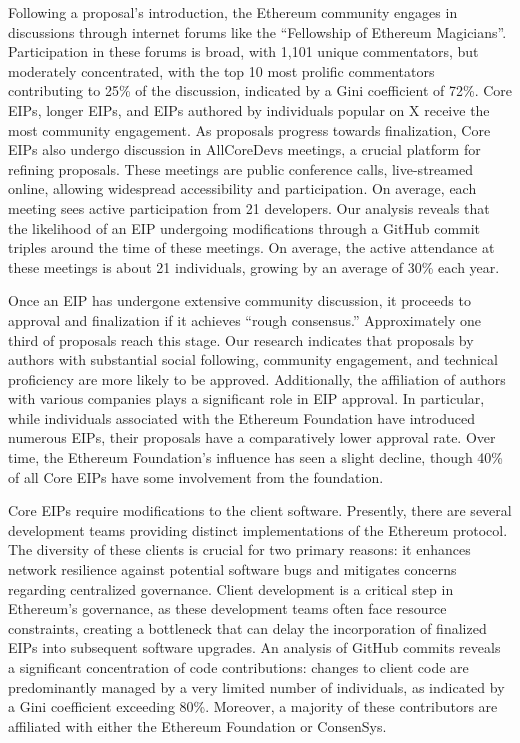 \documentclass[No]{AEA}
\begin{document}
Following a proposal's introduction, the Ethereum community engages in discussions through internet forums like the ``Fellowship of Ethereum Magicians''. Participation in these forums is broad, with 1,101 unique commentators, but moderately concentrated,  with the top 10 most prolific commentators contributing to 25\% of the discussion, indicated by a Gini coefficient of 72\%. Core EIPs, longer EIPs, and EIPs authored by individuals popular on X receive the most community engagement. As proposals progress towards finalization, Core EIPs also undergo discussion in AllCoreDevs meetings, a crucial platform for refining proposals. These meetings are public conference calls, live-streamed online, allowing widespread accessibility and participation. On average, each meeting sees active participation from 21 developers.  Our analysis reveals that the likelihood of an EIP undergoing modifications through a GitHub commit triples around the time of these meetings. On average, the active attendance at these meetings is about 21 individuals, growing by an average of 30\% each year.

Once an EIP has undergone extensive community discussion, it proceeds to approval and finalization if it achieves ``rough consensus.'' Approximately one third of proposals reach this stage. Our research indicates that proposals by authors with substantial social following, community engagement, and technical proficiency are more likely to be approved. Additionally, the affiliation of authors with various companies plays a significant role in EIP approval. In particular, while individuals associated with the Ethereum Foundation have introduced numerous EIPs, their proposals have a comparatively lower approval rate. Over time, the Ethereum Foundation's influence has seen a slight decline, though 40\% of all Core EIPs have some involvement from the foundation. 

Core EIPs require modifications to the client software. Presently, there are several development teams providing distinct implementations of the Ethereum protocol. The diversity of these clients is crucial for two primary reasons: it enhances network resilience against potential software bugs and mitigates concerns regarding centralized governance. Client development is a critical step in Ethereum's governance, as these development teams often face resource constraints, creating a bottleneck that can delay the incorporation of finalized EIPs into subsequent software upgrades. An analysis of GitHub commits reveals a significant concentration of code contributions: changes to client code are predominantly managed by a very limited number of individuals, as indicated by a Gini coefficient exceeding 80\%. Moreover, a majority of these contributors are affiliated with either the Ethereum Foundation or ConsenSys.
\end{document}
